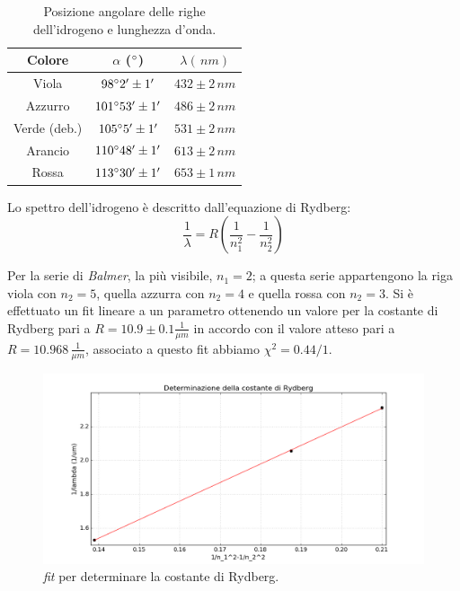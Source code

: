 \documentclass[10pt,a4paper]{article}
\begin{document}
\begin{table}[!htb]
\centering
\begin{tabular}{|c|c|c|}
\hline
Colore & $\alpha$ ($\degree$) & $\lambda (\,nm)$\\
\hline 
Viola & $98 \degree 2' \pm 1'$ & $432 \pm 2 \,nm$ \\ 
\hline 
Azzurro & $101 \degree 53' \pm 1'$ & $486 \pm 2 \,nm$ \\ 
\hline 
Verde (deb.)& $105 \degree 5' \pm 1'$ & $531 \pm 2 \,nm$ \\ 
\hline
Arancio & $110 \degree 48' \pm 1'$ & $613 \pm 2 \,nm$ \\ 
\hline 
Rossa & $113 \degree 30' \pm 1'$ & $653 \pm 1 \,nm$ \\ 
\hline 
\end{tabular} 
\caption{Posizione angolare delle righe dell'idrogeno e lunghezza d'onda.}\label{idrogeno}
\end{table}

Lo spettro dell'idrogeno è descritto dall'equazione di Rydberg:
\begin{equation}
\frac{1}{\lambda}= R \left( \frac{1}{n_{1}^2}-\frac{1}{n_{2}^2} \right)
\end{equation}

Per la serie di \emph{Balmer}, la più visibile, $n_1=2$; a questa serie appartengono la riga viola con $n_2=5$, quella azzurra con $n_2=4$ e quella rossa con $n_2=3$. Si è effettuato un fit lineare a un parametro ottenendo un valore per la costante di Rydberg pari a $R = 10.9 \pm 0.1 \frac{1}{\mu m}$ in accordo con il valore atteso pari a $R=10.968\, \frac{1}{\mu m}$, associato a questo fit abbiamo $\chi^2 = 0.44/1$.\\

\begin{figure}[!htb]
  \centering
  \includegraphics[scale=0.6]{ryd.png}
\caption{\emph{fit} per determinare la costante di Rydberg.}
\label{pin}
\end{figure}
\end{document}
